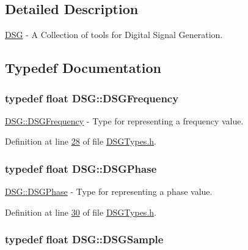 \subsection{Detailed Description}
\hyperlink{namespace_d_s_g}{D\+S\+G} -\/ A Collection of tools for Digital Signal Generation. 

\subsection{Typedef Documentation}
\hypertarget{namespace_d_s_g_a4315a061386fa1014fda09b15d3a6973}{
\subsubsection[{D\+S\+G\+Frequency}]{\setlength{\rightskip}{0pt plus 5cm}typedef float {\bf D\+S\+G\+::\+D\+S\+G\+Frequency}}}\label{namespace_d_s_g_a4315a061386fa1014fda09b15d3a6973}


\hyperlink{namespace_d_s_g_a4315a061386fa1014fda09b15d3a6973}{D\+S\+G\+::\+D\+S\+G\+Frequency} -\/ Type for representing a frequency value. 



Definition at line \hyperlink{_d_s_g_types_8h_source_l00028}{28} of file \hyperlink{_d_s_g_types_8h_source}{D\+S\+G\+Types.\+h}.

\hypertarget{namespace_d_s_g_a44431ce1eb0a7300efdd207bc879e52c}{
\subsubsection[{D\+S\+G\+Phase}]{\setlength{\rightskip}{0pt plus 5cm}typedef float {\bf D\+S\+G\+::\+D\+S\+G\+Phase}}}\label{namespace_d_s_g_a44431ce1eb0a7300efdd207bc879e52c}


\hyperlink{namespace_d_s_g_a44431ce1eb0a7300efdd207bc879e52c}{D\+S\+G\+::\+D\+S\+G\+Phase} -\/ Type for representing a phase value. 



Definition at line \hyperlink{_d_s_g_types_8h_source_l00030}{30} of file \hyperlink{_d_s_g_types_8h_source}{D\+S\+G\+Types.\+h}.

\hypertarget{namespace_d_s_g_ac39a94cd27ebcd9c1e7502d0c624894a}{
\subsubsection[{D\+S\+G\+Sample}]{\setlength{\rightskip}{0pt plus 5cm}typedef float {\bf D\+S\+G\+::\+D\+S\+G\+Sample}}}\label{namespace_d_s_g_ac39a94cd27ebcd9c1e7502d0c624894a}


